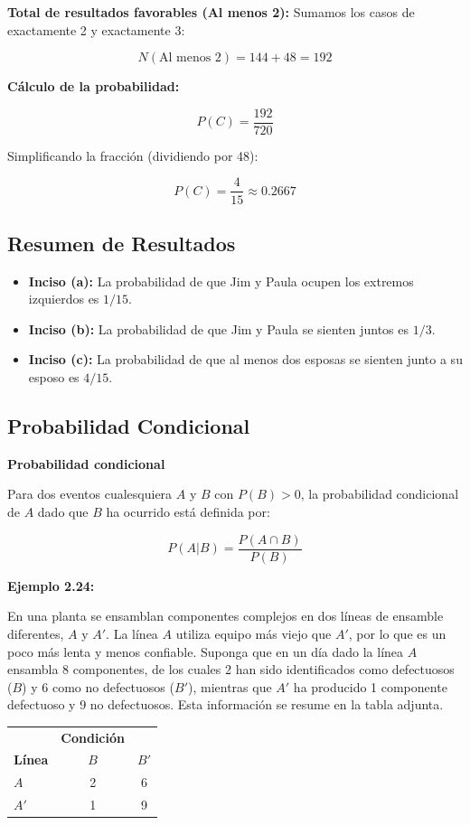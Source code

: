\documentclass[a4paper]{article}
\begin{document}
\textbf{Total de resultados favorables (Al menos 2):}
Sumamos los casos de exactamente 2 y exactamente 3:

$$ N(\text{Al menos 2}) = 144 + 48 = 192 $$

\textbf{Cálculo de la probabilidad:}

$$ P(C) = \frac{192}{720} $$

Simplificando la fracción (dividiendo por 48):

$$ P(C) = \frac{4}{15} \approx 0.2667 $$

\subsection*{Resumen de Resultados}

\begin{itemize}
    \item \textbf{Inciso (a):} La probabilidad de que Jim y Paula ocupen los extremos izquierdos es \textbf{$1/15$}.
    \item \textbf{Inciso (b):} La probabilidad de que Jim y Paula se sienten juntos es \textbf{$1/3$}.
    \item \textbf{Inciso (c):} La probabilidad de que al menos dos esposas se sienten junto a su esposo es \textbf{$4/15$}.
\end{itemize}


\subsection{Probabilidad Condicional}

\textbf{Probabilidad condicional}

Para dos eventos cualesquiera $A$ y $B$ con $P(B) > 0$, la probabilidad condicional de $A$ dado que $B$ ha ocurrido está definida por:

$$ P(A | B) = \frac{P(A \cap B)}{P(B)} $$

\textbf{Ejemplo 2.24:}

En una planta se ensamblan componentes complejos en dos líneas de ensamble diferentes, $A$ y $A'$. La línea $A$ utiliza equipo más viejo que $A'$, por lo que es un poco más lenta y menos confiable. Suponga que en un día dado la línea $A$ ensambla 8 componentes, de los cuales 2 han sido identificados como defectuosos ($B$) y 6 como no defectuosos ($B'$), mientras que $A'$ ha producido 1 componente defectuoso y 9 no defectuosos. Esta información se resume en la tabla adjunta.

\begin{center}
\begin{tabular}{lcc}
& \textbf{Condición} & \\
\textbf{Línea} & $B$ & $B'$ \\ \hline
$A$ & 2 & 6 \\
$A'$ & 1 & 9 \\ \hline
\end{tabular}
\end{center}
\end{document}
